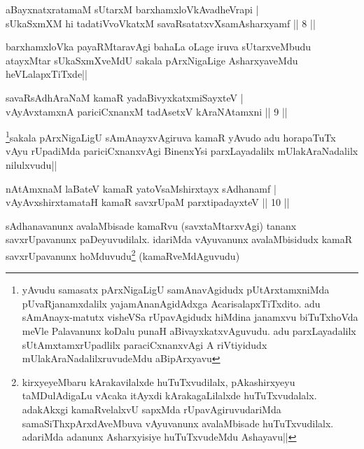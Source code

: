 \begin{shl}
aBayxnatxratamaM sUtarxM barxhamxloVkAvadheVrapi |\\
sUkaSxmXM hi tadatiVvoVkatxM savaRsatatxvXsamAsharxyamf \hfill || 8 ||
\end{shl}

\begin{artha}%
barxhamxloVka payaRMtaravAgi bahaLa oLage iruva sUtarxveMbudu atayxMtar sUkaSxmXveMdU sakala pArxNigaLige AsharxyaveMdu heVLalapxTiTxde||
\end{artha}

\begin{shl}
savaRsAdhAraNaM kamaR yadaBivyxkatxmiSayxteV |\\
vAyAvxtamxnA pariciCxnanxM tadAsetxV kAraNAtamxni \hfill || 9 ||
\end{shl}

\begin{artha}
\footnote[1]{yAvudu samasatx pArxNigaLigU samAnavAgidudx pUtArxtamxniMda pUvaRjanamxdalilx yajamAnanAgidAdxga AcarisalapxTiTxdito. adu sAmAnayx-matutx visheVSa rUpavAgidudx hiMdina janamxvu biTuTxhoVda meVle Palavanunx koDalu punaH aBivayxkatxvAguvudu. adu parxLayadalilx sUtAmxtamxrUpadlilx paraciCxnanxvAgi A riVtiyidudx mUlakAraNadalilxruvudeMdu aBipArxyavu}sakala pArxNigaLigU sAmAnayxvAgiruva kamaR yAvudo adu horapaTuTx vAyu rUpadiMda pariciCxnanxvAgi BinenxYsi parxLayadalilx mUlakAraNadalilx nilulxvudu||
\end{artha}


\begin{shl}
nA\s \s tAmxnaM laBateV kamaR yatoV\s saMshirxtayx sAdhanamf |\\
vAyAvxshirxtamataH kamaR savxrUpaM parxtipadayxteV \hfill || 10 ||
\end{shl}

\begin{artha}
sAdhanavanunx avalaMbisade kamaRvu (savxtaMtarxvAgi) tananx savxrUpavanunx paDeyuvudilalx. idariMda vAyuvanunx avalaMbisidudx kamaR savxrUpavanunx hoMduvudu\footnote[2]{kirxyeyeMbaru kArakavilalxde huTuTxvudilalx, pAkashirxyeyu taMDulAdigaLu vAcaka itAyxdi kArakagaLilalxde huTuTxvudalalx. adakAkxgi kamaRvelalxvU sapxMda rUpavAgiruvudariMda samaSiThxpArxdAveMbuva vAyuvanunx avalaMbisade huTuTxvudilalx. adariMda adanunx Asharxyisiye huTuTxvudeMdu Ashayavu||} (kamaRveMdAguvudu)
\end{artha}


